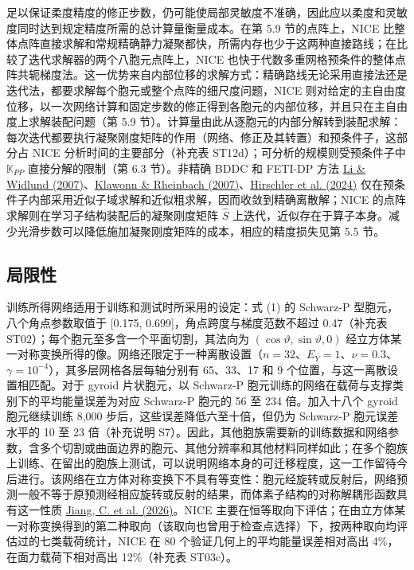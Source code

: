 \documentclass[preprint,12pt,authoryear]{elsarticle}
\begin{document}
足以保证柔度精度的修正步数，仍可能使局部灵敏度不准确，因此应以柔度和灵敏度同时达到规定精度所需的总计算量衡量成本。在第 5.9 节的点阵上，NICE 比整体点阵直接求解和常规精确静力凝聚都快，所需内存也少于这两种直接路线；在比较了迭代求解器的两个八胞元点阵上，NICE 也快于代数多重网格预条件的整体点阵共轭梯度法。这一优势来自内部位移的求解方式：精确路线无论采用直接法还是迭代法，都要求解每个胞元或整个点阵的细尺度问题，NICE 则对给定的主自由度位移，以一次网络计算和固定步数的修正得到各胞元的内部位移，并且只在主自由度上求解装配问题（第 5.9 节）。计算量由此从逐胞元的内部分解转到装配求解：每次迭代都要执行凝聚刚度矩阵的作用（网络、修正及其转置）和预条件子，这部分占 NICE 分析时间的主要部分（补充表 ST12d）；可分析的规模则受预条件子中 \(\mathbb K_{PP}\) 直接分解的限制（第 6.3 节）。非精确 BDDC 和 FETI-DP 方法 \href{https://doi.org/10.1016/j.cma.2006.03.011}{Li \& Widlund (2007)}、\href{https://doi.org/10.1002/nme.1758}{Klawonn \& Rheinbach (2007)}、\href{https://doi.org/10.1002/nme.7419}{Hirschler et al. (2024)} 仅在预条件子内部采用近似子域求解和近似粗求解，因而收敛到精确离散解；NICE 的点阵求解则在学习子结构装配后的凝聚刚度矩阵 \(\widehat S\) 上迭代，近似存在于算子本身。减少光滑步数可以降低施加凝聚刚度矩阵的成本，相应的精度损失见第 5.5 节。

\subsection{局限性}

训练所得网络适用于训练和测试时所采用的设定：式 (1) 的 Schwarz-P 型胞元，八个角点参数取值于 {[}0.175, 0.699{]}，角点跨度与梯度范数不超过 0.47（补充表 ST02）；每个胞元至多含一个平面切割，其法向为 \((\cos\vartheta,\sin\vartheta,0)\) 经立方体某一对称变换所得的像。网络还限定于一种离散设置（\(n=32\)、\(E_Y=1\)、\(\nu=0.3\)、\(\gamma=10^{-4}\)），其多层网格各层每轴分别有 65、33、17 和 9 个位置，与这一离散设置相匹配。对于 gyroid 片状胞元，以 Schwarz-P 胞元训练的网络在载荷与支撑类别下的平均能量误差为对应 Schwarz-P 胞元的 56 至 234 倍。加入十八个 gyroid 胞元继续训练 8,000 步后，这些误差降低六至十倍，但仍为 Schwarz-P 胞元误差水平的 10 至 23 倍（补充说明 S7）。因此，其他胞族需要新的训练数据和网络参数，含多个切割或曲面边界的胞元、其他分辨率和其他材料同样如此；在多个胞族上训练、在留出的胞族上测试，可以说明网络本身的可迁移程度，这一工作留待今后进行。该网络在立方体对称变换下不具有等变性：胞元经旋转或反射后，网络预测一般不等于原预测经相应旋转或反射的结果，而体素子结构的对称解耦形函数具有这一性质 \href{https://doi.org/10.1016/j.compstruct.2026.120865}{Jiang, C. et al. (2026)}。NICE 主要在恒等取向下评估；在由立方体某一对称变换得到的第二种取向（该取向也曾用于检查点选择）下，按两种取向均评估过的七类载荷统计，NICE 在 80 个验证几何上的平均能量误差相对高出 4\%，在面力载荷下相对高出 12\%（补充表 ST03c）。
\end{document}
